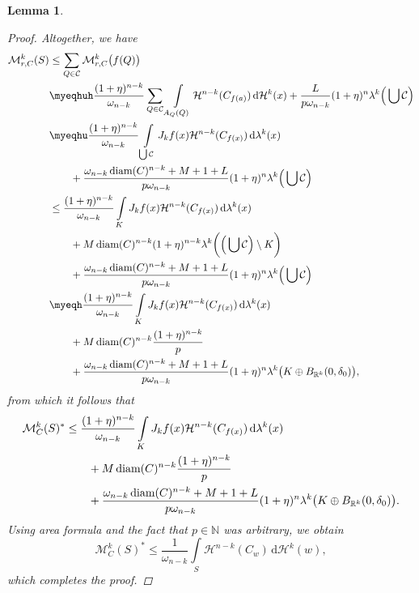 \documentclass[pdflatex,sn-mathphys-num]{sn-jnl}
\theoremstyle{plain}
\newtheorem{lemma}[theorem]{Lemma}
\theoremstyle{definition}
\DeclareMathOperator{\diam}{\textup{diam}}
\newcommand{\dH}[1]{\,\mathrm d\mathcal{H}^{#1}}
\newcommand{\dlambda}[1]{\,\mathrm d\lambda^{#1}}
\begin{document}
\begin{lemma}
\begin{proof}
        Altogether, we have \begin{equation*}
            \begin{split}\mathcal{M}^k_{r, C}(S)&\leq\sum_{Q\in\mathcal{C}}\mathcal{M}^k_{r, C}\big(f(Q)\big)\\&\myeqhuh\frac{(1+\eta)^{n-k}}{\omega_{n-k}}\sum_{Q\in\mathcal{C}}\int\limits_{A_Q(Q)}\mathcal{H}^{n-k}(C_{f(a)})\dH{k}(x)+\frac{L}{p\omega_{n-k}}(1+\eta)^n\lambda^k\Big(\bigcup\mathcal{C}\Big)\\&\myeqhu\frac{(1+\eta)^{n-k}}{\omega_{n-k}}\int\limits_{\bigcup \mathcal{C}}J_kf(x)\mathcal{H}^{n-k}(C_{f(x)})\dlambda{k}(x)\\&\quad\quad+\frac{\omega_{n-k}\diam(C)^{n-k}+M+1+L}{p\omega_{n-k}}(1+\eta)^n\lambda^k\Big(\bigcup\mathcal{C}\Big)\\&\leq\frac{(1+\eta)^{n-k}}{\omega_{n-k}}\int\limits_{K}J_kf(x)\mathcal{H}^{n-k}(C_{f(x)})\dlambda{k}(x)\\&\quad\quad+M\diam(C)^{n-k}(1+\eta)^{n-k}\lambda^k\bigg(\Big(\bigcup\mathcal{C}\Big)\setminus K\bigg)\\&\quad\quad+\frac{\omega_{n-k}\diam(C)^{n-k}+M+1+L}{p\omega_{n-k}}(1+\eta)^n\lambda^k\Big(\bigcup\mathcal{C}\Big)\\&\myeqh\frac{(1+\eta)^{n-k}}{\omega_{n-k}}\int\limits_{K}J_kf(x)\mathcal{H}^{n-k}(C_{f(x)})\dlambda{k}(x)\\&\quad\quad+M\diam(C)^{n-k}\frac{(1+\eta)^{n-k}}{p}\\&\quad\quad+\frac{\omega_{n-k}\diam(C)^{n-k}+M+1+L}{p\omega_{n-k}}(1+\eta)^n\lambda^k\big(K\oplus B_{\mathbb{R}^k}(0, \delta_0)\big),
            \end{split}
        \end{equation*}
        from which it follows that \begin{equation*}
            \begin{split}
\mathcal{M}^k_{C}(S)^*&\leq\frac{(1+\eta)^{n-k}}{\omega_{n-k}}\int\limits_{K}J_kf(x)\mathcal{H}^{n-k}(C_{f(x)})\dlambda{k}(x)\\&\quad\quad+M\diam(C)^{n-k}\frac{(1+\eta)^{n-k}}{p}\\&\quad\quad+\frac{\omega_{n-k}\diam(C)^{n-k}+M+1+L}{p\omega_{n-k}}(1+\eta)^{n}\lambda^k\big(K\oplus B_{\mathbb{R}^k}(0, \delta_0)\big).
            \end{split}
        \end{equation*}
        Using area formula and the fact that $p\in\mathbb{N}$ was arbitrary, we obtain
     $$\mathcal{M}^k_{C}(S)^*\leq\frac{1}{\omega_{n-k}}\int\limits_{S}\mathcal{H}^{n-k}(C_{w})\dH{k}(w),$$ which completes the proof.
     \end{proof}
\end{lemma}
\end{document}

